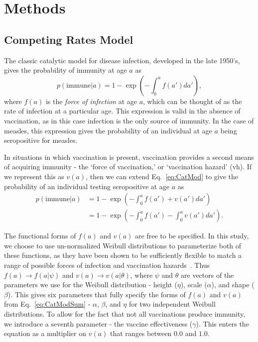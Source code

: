 \documentclass[nofootinbib,aps,pre,twocolumn,superscriptaddress,showkeys,showpacs]{revtex4-1}
\begin{document}
\section{Methods \label{sec:Methods}}
\subsection{Competing Rates Model \label{subsec:CompetingRates}}
The classic catalytic model for disease infection, developed in the late 1950's, gives the probability of immunity at age $a$ as
\begin{equation}
p(\mathrm{immune}|a) = 1 - \exp\left(-\int_0^a f(a') da'\right),
\label{eq:CatMod}
\end{equation}
where $f(a)$ is the \emph{force of infection} at age $a$, which can be thought of as the rate of infection at a particular age. This expression is valid in the absence of vaccination, as in this case infection is the only source of immunity. In the case of measles, this expression gives the probability of an individual at age $a$ being seropositive for measles.

In situations in which vaccination is present, vaccination provides a second means of acquiring immunity - the `force of vaccination,' or `vaccination hazard' (vh). If we represent this as $v(a)$, then we can extend Eq.~\ref{eq:CatMod} to give the probability of an individual testing seropositive at age $a$ as
\begin{align}
p(\mathrm{immune}|a)  &= 1 - \exp\left( - \int_0^a f(a') + v(a') da'\right) \nonumber \\ 
&=1 - \exp\left(-\int_0^a f(a') - \int_0^a v(a') da'\right).
\label{eq:CatModSum}
\end{align}

The functional forms of $f(a)$ and $v(a)$ are free to be specified. In this study, we choose to use un-normalized Weibull distributions to parameterize both of these functions, as they have been shown to be sufficiently flexible to match a range of possible forces of infection and vaccination hazards~\cite{ferrari_episodic_2010}. Thus $f(a) \rightarrow f(a|\mathbb{\psi})$ and $v(a) \rightarrow v(a|\mathbb{\theta})$, where $\mathbb{\psi}$ and $\mathbb{\theta}$ are vectors of the parameters we use for the Weibull distribution - height ($\eta$), scale ($\alpha$), and shape ($\beta$). This gives six parameters that fully specify the forms of $f(a)$ and $v(a)$ from Eq.~\ref{eq:CatModSum} - $\alpha$, $\beta$, and $\eta$ for two independent Weibull distributions. To allow for the fact that not all vaccinations produce immunity, we introduce a seventh parameter - the vaccine effectiveness ($\gamma$). This enters the equation as a multiplier on $v(a)$ that ranges between $0.0$ and $1.0$.
\end{document}
